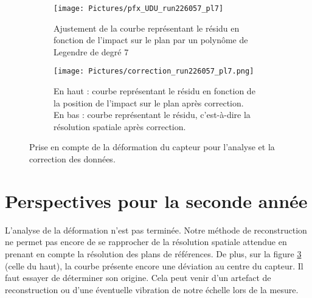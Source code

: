 \documentclass[a4papper, 10pt]{article}
\begin{document}
 \begin{figure}
     \centering
     \begin{subfigure}[c]{0.46\linewidth}
        \texttt{[image: Pictures/pfx\_UDU\_run226057\_pl7]}
        \caption{Ajustement de la courbe représentant le résidu en fonction de l'impact sur le plan par un polynôme de Legendre de degré 7}
        \label{legendre}
     \end{subfigure}
     \quad
     \begin{subfigure}[c]{0.46\linewidth}
        \texttt{[image: Pictures/correction\_run226057\_pl7.png]}
        \caption{En haut : courbe représentant le résidu en fonction de la position de l'impact sur le plan après correction.
        \\ En bas : courbe représentant le résidu, c'est-à-dire la résolution spatiale après correction.}
        \label{corrected}
     \end{subfigure}
     \caption{Prise en compte de la déformation du capteur pour l'analyse et la correction des données.}
 \end{figure}


    \section{Perspectives pour la seconde année}

        L'analyse de la déformation n'est pas terminée. Notre méthode de reconstruction ne permet pas encore de se rapprocher de la résolution spatiale attendue en prenant en compte la résolution des plans de références. De plus, sur la figure \ref{corrected} (celle du haut), la courbe présente encore une déviation au centre du capteur. 
        Il faut essayer de déterminer son origine. Cela peut venir d'un artefact de reconstruction ou d'une éventuelle vibration de notre échelle lors de la mesure.
\end{document}
